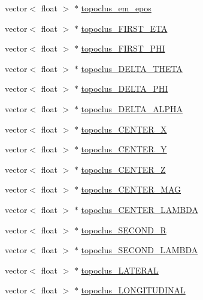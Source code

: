 \begin{DoxyCompactItemize}
\item 
vector$<$ float $>$ $\ast$ \hyperlink{classXMLWriter_afbac850e604f1fa33f251b12d4df2a94}{topoclus\+\_\+em\+\_\+epos}
\item 
vector$<$ float $>$ $\ast$ \hyperlink{classXMLWriter_a365e591e6aa2837044e916be36225e29}{topoclus\+\_\+\+F\+I\+R\+S\+T\+\_\+\+E\+TA}
\item 
vector$<$ float $>$ $\ast$ \hyperlink{classXMLWriter_ad9e93c76d4e16d3c00d417db1ac53d89}{topoclus\+\_\+\+F\+I\+R\+S\+T\+\_\+\+P\+HI}
\item 
vector$<$ float $>$ $\ast$ \hyperlink{classXMLWriter_a89425a268ed8374e3c8c7b9d1e18285e}{topoclus\+\_\+\+D\+E\+L\+T\+A\+\_\+\+T\+H\+E\+TA}
\item 
vector$<$ float $>$ $\ast$ \hyperlink{classXMLWriter_a5590d0a7307494eee71f97727cf73386}{topoclus\+\_\+\+D\+E\+L\+T\+A\+\_\+\+P\+HI}
\item 
vector$<$ float $>$ $\ast$ \hyperlink{classXMLWriter_a0dcdef6a155c3e5191f232a907d9e420}{topoclus\+\_\+\+D\+E\+L\+T\+A\+\_\+\+A\+L\+P\+HA}
\item 
vector$<$ float $>$ $\ast$ \hyperlink{classXMLWriter_ad90872ef4830b22c34c6f464e83652d9}{topoclus\+\_\+\+C\+E\+N\+T\+E\+R\+\_\+X}
\item 
vector$<$ float $>$ $\ast$ \hyperlink{classXMLWriter_a7ef4861b5dda44c1acefc2c7f423c208}{topoclus\+\_\+\+C\+E\+N\+T\+E\+R\+\_\+Y}
\item 
vector$<$ float $>$ $\ast$ \hyperlink{classXMLWriter_a935d27f0393ae0ed76dc115d7fe10a6e}{topoclus\+\_\+\+C\+E\+N\+T\+E\+R\+\_\+Z}
\item 
vector$<$ float $>$ $\ast$ \hyperlink{classXMLWriter_adf9c0b11e2f9cc20dd49bf871f2a0992}{topoclus\+\_\+\+C\+E\+N\+T\+E\+R\+\_\+\+M\+AG}
\item 
vector$<$ float $>$ $\ast$ \hyperlink{classXMLWriter_a95bb165a710a231b5d4f08e0ca19b24f}{topoclus\+\_\+\+C\+E\+N\+T\+E\+R\+\_\+\+L\+A\+M\+B\+DA}
\item 
vector$<$ float $>$ $\ast$ \hyperlink{classXMLWriter_a8809720b8f446dddb6f0ced25dde4a7a}{topoclus\+\_\+\+S\+E\+C\+O\+N\+D\+\_\+R}
\item 
vector$<$ float $>$ $\ast$ \hyperlink{classXMLWriter_a0584db04d3e63f493a67d499268b2cce}{topoclus\+\_\+\+S\+E\+C\+O\+N\+D\+\_\+\+L\+A\+M\+B\+DA}
\item 
vector$<$ float $>$ $\ast$ \hyperlink{classXMLWriter_a6f888883b5a35518dbe59959a05603cd}{topoclus\+\_\+\+L\+A\+T\+E\+R\+AL}
\item 
vector$<$ float $>$ $\ast$ \hyperlink{classXMLWriter_a8826f201e8abbf71cb7cfca81476a5a1}{topoclus\+\_\+\+L\+O\+N\+G\+I\+T\+U\+D\+I\+N\+AL}

\end{DoxyCompactItemize}
